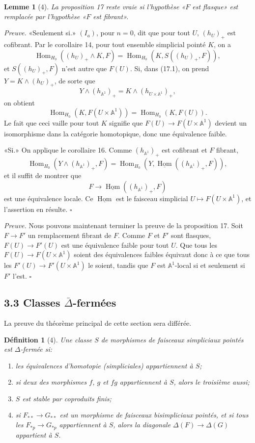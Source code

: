 \documentclass[11pt]{article}
\newcommand{\Aone}{\mathbb A^1}
\newcommand{\Hom}{\operatorname{Hom}}
\theoremstyle{deligne}
\newtheorem*{lemma*}{Lemme}
\newtheorem*{definition*}{Définition}
\newenvironment{proofdel}{\noindent\textit{Preuve.}}{\hfill$\square$}
\newcommand{\uHom}{\underline{\Hom}}
\begin{document}
\begin{lemma*}[4]
La proposition 17 reste vraie si l'hypothèse «\(F\) est flasque» est remplacée par l'hypothèse «\(F\) est fibrant».
\end{lemma*}

\begin{proofdel}
«Seulement si.» \((I_a)\), pour \(n=0\), dit que pour tout \(U\), \((h_U)_+\) est cofibrant. Par le corollaire 14, pour tout ensemble simplicial pointé \(K\), on a
\[
\Hom_{H_0}((h_U)_+\wedge K,F)=\Hom_{H_0}(K,S((h_U)_+,F)),
\]
et \(S((h_U)_+,F)\) n'est autre que \(F(U)\). Si, dans (17.1), on prend \(Y=K\wedge(h_U)_+\), de sorte que
\[
Y\wedge(h_{\Aone})_+=K\wedge(h_{U\times\Aone})_+,
\]
on obtient
\[
\Hom_{H_0}(K,F(U\times\Aone))=\Hom_{H_0}(K,F(U)).
\]
Le fait que ceci vaille pour tout \(K\) signifie que \(F(U)\to F(U\times\Aone)\) devient un isomorphisme dans la catégorie homotopique, donc une équivalence faible.

«Si.» On applique le corollaire 16. Comme \((h_{\Aone})_+\) est cofibrant et \(F\) fibrant,
\[
\Hom_{H_0}(Y\wedge(h_{\Aone})_+,F)=\Hom_{H_0}(Y,\uHom((h_{\Aone})_+,F)),
\]
et il suffit de montrer que
\[
F\longrightarrow \uHom((h_{\Aone})_+,F)
\]
est une équivalence locale. Ce \(\uHom\) est le faisceau simplicial \(U\mapsto F(U\times\Aone)\), et l'assertion en résulte.
\end{proofdel}

\begin{proofdel}
Nous pouvons maintenant terminer la preuve de la proposition 17. Soit \(F\to F'\) un remplacement fibrant de \(F\). Comme \(F\) et \(F'\) sont flasques, \(F(U)\to F'(U)\) est une équivalence faible pour tout \(U\). Que tous les \(F(U)\to F(U\times\Aone)\) soient des équivalences faibles équivaut donc à ce que tous les \(F'(U)\to F'(U\times\Aone)\) le soient, tandis que \(F\) est \(\Aone\)-local si et seulement si \(F'\) l'est.
\end{proofdel}

\subsection*{3.3 Classes \(\bar\Delta\)-fermées}

La preuve du théorème principal de cette section sera différée.

\begin{definition*}[4]
Une classe \(S\) de morphismes de faisceaux simpliciaux pointés est \(\Delta\)-fermée si:
\begin{enumerate}[label=\arabic*.]
\item les équivalences d'homotopie (simpliciales) appartiennent à \(S\);
\item si deux des morphismes \(f\), \(g\) et \(fg\) appartiennent à \(S\), alors le troisième aussi;
\item \(S\) est stable par coproduits finis;
\item si \(F_{**}\to G_{**}\) est un morphisme de faisceaux bisimpliciaux pointés, et si tous les \(F_{*p}\to G_{*p}\) appartiennent à \(S\), alors la diagonale \(\Delta(F)\to\Delta(G)\) appartient à \(S\).
\end{enumerate}
\end{definition*}
\end{document}
